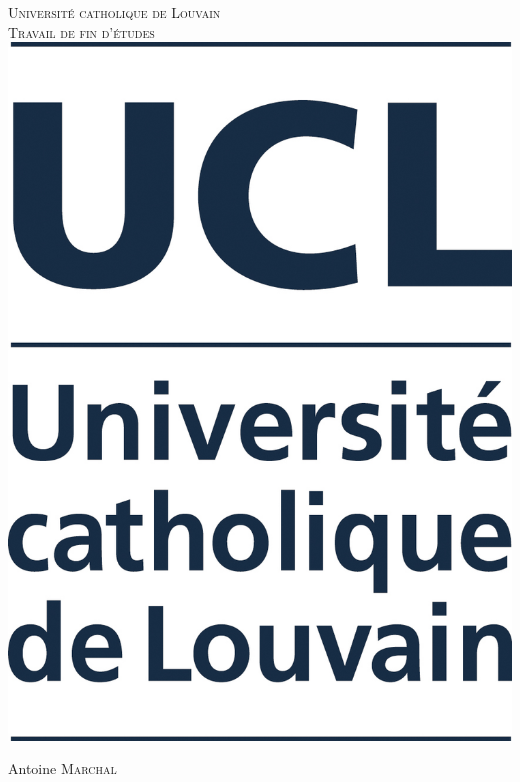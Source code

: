 \documentclass[a4paper,12pt,french]{report}
\begin{document}
\begin{titlepage}
\center

\textsc{\LARGE Université catholique de Louvain}\\[1.5cm]
\textsc{\Large Travail de fin d'études}\\[2cm]

\includegraphics[scale=.15]{UCL_mention_pantone282.jpg}\\[1.5cm]

\begin{minipage}{0.4\textwidth}
\begin{center}
\Large Antoine \textsc{Marchal}
\end{center}
\end{minipage}\\[5cm]


\end{titlepage}
\end{document}
